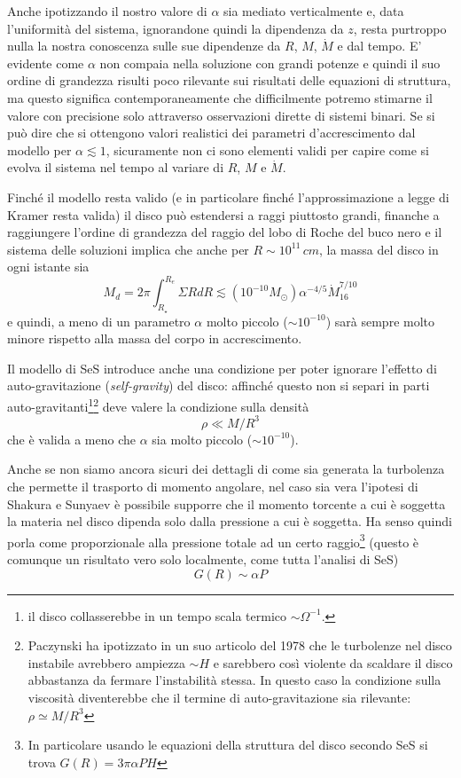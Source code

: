 \documentclass[a4paperbi]{article}
\begin{document}
	Anche ipotizzando il nostro valore di $\alpha$ sia mediato verticalmente e, data l'uniformità del sistema, ignorandone quindi la dipendenza da $z$, resta purtroppo nulla la nostra conoscenza sulle sue dipendenze da $R$, $M$, $\dot{M}$ e dal tempo.
	E' evidente come $\alpha$ non compaia nella soluzione con grandi potenze e quindi il suo ordine di grandezza risulti poco rilevante sui risultati delle equazioni di struttura, ma questo significa contemporaneamente che difficilmente potremo stimarne il valore con precisione solo attraverso osservazioni dirette di sistemi binari. 	
	Se si può dire che si ottengono valori realistici dei parametri d'accrescimento dal modello per $\alpha\lesssim1$, sicuramente non ci sono elementi validi per capire come si evolva il sistema nel tempo al variare di $R$, $M$ e $\dot{M}$.
	
	Finché il modello resta valido (e in particolare finché l'approssimazione a legge di Kramer resta valida) il disco può estendersi a raggi piuttosto grandi, finanche a raggiungere l'ordine di grandezza del raggio del lobo di Roche del buco nero e il sistema delle soluzioni implica che anche per $R\sim10^{11}\,cm$, la massa del disco in ogni istante sia
	\begin{equation}
		M_d=2\pi\int^{R_{e}}_{R_\star}\Sigma RdR\lesssim (10^{-10}M_\odot)\alpha^{-4/5}\dot{M}^{7/10}_{16}
	\end{equation}
	e quindi, a meno di un parametro $\alpha$ molto piccolo ($\sim10^{-10}$) sarà sempre molto minore rispetto alla massa del corpo in accrescimento.
	
	Il modello di SeS introduce anche una condizione per poter ignorare l'effetto di auto-gravitazione (\textit{self-gravity}) del disco: affinché questo non si separi in parti auto-gravitanti\footnote{il disco collasserebbe in un tempo scala termico $\sim\Omega^{-1}$.}\footnote{Paczynski ha ipotizzato in un suo articolo del 1978 che le turbolenze nel disco instabile avrebbero ampiezza $\sim H$ e sarebbero così violente da scaldare il disco abbastanza da fermare l'instabilità stessa. In questo caso la condizione sulla viscosità diventerebbe che il termine di auto-gravitazione sia rilevante: $\rho\simeq M/R^3$} deve valere la condizione sulla densità
		\begin{equation}
			\rho\ll M/R^3
		\end{equation}
	che è valida a meno che $\alpha$ sia molto piccolo ($\sim10^{-10}$).
	
	Anche se non siamo ancora sicuri dei dettagli di come sia generata la turbolenza che permette il trasporto di momento angolare, nel caso sia vera l'ipotesi di Shakura e Sunyaev è possibile supporre che il momento torcente a cui è soggetta la materia nel disco dipenda solo dalla pressione a cui è soggetta. Ha senso quindi porla come proporzionale alla pressione totale ad un certo raggio\footnote{In particolare usando le equazioni della struttura del disco secondo SeS si trova $G(R)=3\pi\alpha PH$} (questo è comunque un risultato vero solo localmente, come tutta l'analisi di SeS)
	\begin{equation}
		G(R)\sim\alpha P
	\end{equation}
	
\end{document}
